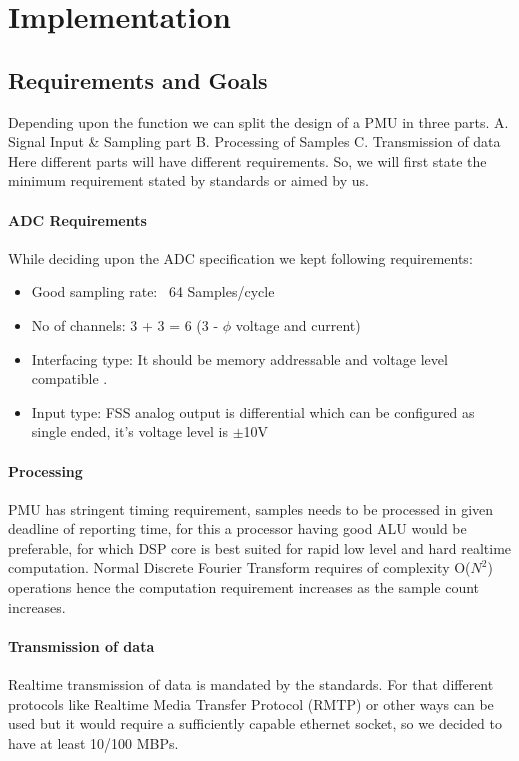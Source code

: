 \chapter{Implementation}
\section{Requirements and Goals}
Depending upon the function we can split the design of a PMU in three parts. 
A. Signal Input \& Sampling part
B. Processing of Samples  
C. Transmission of data
Here different parts will have different requirements. So, we will first state the minimum requirement stated by standards or aimed by us.

\subsubsection{ADC Requirements}
While deciding upon the ADC specification we kept following requirements: 
\begin{itemize}
	\item Good sampling rate: ~64 Samples/cycle
	\item No of channels: 3 + 3 = 6 (3 - $\phi$ voltage and current) 
	\item Interfacing type: It should be memory addressable and voltage level compatible .
	\item Input type: FSS analog output is differential which can be configured as single ended, it's voltage level is $\pm$10V
\end{itemize}

\subsubsection{Processing}
PMU has stringent timing requirement, samples needs to be processed in given deadline of reporting time, for this a processor having good ALU would be preferable, for which DSP core is best suited for rapid low level and hard realtime computation. Normal Discrete Fourier Transform requires of complexity O($N^{2}$) operations hence the computation requirement increases as the sample count increases. 

\subsubsection{Transmission of data}
Realtime transmission of data is mandated by the standards\cite{c37.118}. For that different protocols like Realtime  Media Transfer Protocol (RMTP) or other ways can be used but it would require a sufficiently capable ethernet socket, so we decided to have at least 10/100 MBPs.

